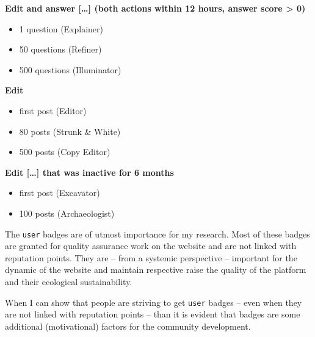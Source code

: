 \documentclass[]{book}
\providecommand{\tightlist}{%
  \setlength{\itemsep}{0pt}\setlength{\parskip}{0pt}}
\theoremstyle{definition}
\theoremstyle{definition}
\theoremstyle{definition}
\theoremstyle{remark}
\begin{document}
\textbf{Edit and answer {[}\ldots{}{]} (both actions within 12 hours,
answer score \textgreater{} 0)}

\begin{itemize}
\tightlist
\item
  1 question (Explainer)
\item
  50 questions (Refiner)
\item
  500 questions (Illuminator)
\end{itemize}

\textbf{Edit}

\begin{itemize}
\tightlist
\item
  first post (Editor)
\item
  80 posts (Strunk \& White)
\item
  500 posts (Copy Editor)
\end{itemize}

\textbf{Edit {[}\ldots{}{]} that was inactive for 6 months}

\begin{itemize}
\tightlist
\item
  first post (Excavator)
\item
  100 posts (Archaeologist)
\end{itemize}

The \texttt{user} badges are of utmost importance for my research. Most
of these badges are granted for quality assurance work on the website
and are not linked with reputation points. They are -- from a systemic
perspective -- important for the dynamic of the website and maintain
respective raise the quality of the platform and their ecological
sustainability.

When I can show that people are striving to get \texttt{user} badges --
even when they are not linked with reputation points -- than it is
evident that badges are some additional (motivational) factors for the
community development.
\end{document}
